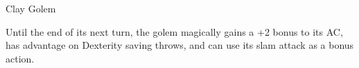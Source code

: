 \begin{monsterbox}{Clay Golem}
\begin{monsteraction}[Slam]
\end{monsteraction}
\begin{monsteraction}
Until the end of its next turn, the golem magically gains a +2 bonus to its AC, has advantage on Dexterity saving throws, and can use its slam attack as a bonus action.
\end{monsteraction}
\end{monsterbox}